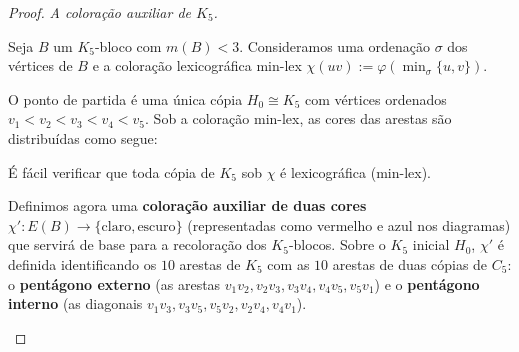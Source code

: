 \documentclass[reqno, 12pt]{amsart}
\numberwithin{equation}{section}
\theoremstyle{plain}
\theoremstyle{definition}
\newcommand{\maxdens}{m}
\begin{document}
\begin{proof}

\noindent\textit{A coloração auxiliar de $K_5$.}

Seja $B$ um $K_5$-bloco com $\maxdens(B) < 3$.
Consideramos uma ordenação $\sigma$ dos vértices de $B$ e a coloração lexicográfica min-lex
$\chi(uv) := \varphi(\min_\sigma\{u,v\})$.

O ponto de partida é uma única cópia $H_0 \cong K_5$ com vértices ordenados $v_1 < v_2 < v_3 < v_4 < v_5$.
Sob a coloração min-lex, as cores das arestas são distribuídas como segue:

\medskip
\medskip
\begin{center}
\end{center}

\noindent
É fácil verificar que toda cópia de $K_5$ sob $\chi$ é lexicográfica (min-lex).

Definimos agora uma \textbf{coloração auxiliar de duas cores} $\chi': E(B) \to \{\text{claro}, \text{escuro}\}$
(representadas como vermelho e azul nos diagramas) que servirá de base para a recoloração dos $K_5$-blocos.
Sobre o $K_5$ inicial $H_0$, $\chi'$ é definida identificando os $10$ arestas de $K_5$ com as $10$ arestas de
duas cópias de $C_5$: o \textbf{pentágono externo} (as arestas $v_1v_2, v_2v_3, v_3v_4, v_4v_5, v_5v_1$)
e o \textbf{pentágono interno} (as diagonais $v_1v_3, v_3v_5, v_5v_2, v_2v_4, v_4v_1$).

\begin{center}
\end{center}


\end{proof}
\end{document}
